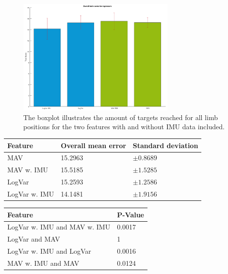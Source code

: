 \begin{figure}[H]
	\includegraphics[width=0.7\textwidth]{figures/results/sumMoreBarsWithTargetsReachedForAllRegressors}  %
	\caption{The boxplot illustrates the amount of targets reached for all limb positions for the two features with and without IMU data included.}
	\label{fig:TargetsReachedOverall}  %
\end{figure}

\begin{center}
	\begin{tabular}{l l l}
		\toprule
		\textbf{Feature} & \textbf{Overall mean error} & \textbf{Standard deviation}\\
		\midrule
		MAV & 15.2963 & $\pm 0.8689$ \\
		MAV w. IMU & 15.5185 & $\pm 1.5285$ \\
		LogVar & 15.2593 & $\pm 1.2586$ \\
		LogVar w. IMU & 14.1481 & $\pm 1.9156$ \\
		\bottomrule
	\end{tabular}
\end{center}

		
\begin{center}
	\begin{tabular}{l l}
		\toprule
		\textbf{Feature} & \textbf{P-Value}\\
		\midrule
		LogVar w. IMU and MAV w. IMU & 0.0017 \\
		LogVar and MAV & 1 \\
		LogVar w. IMU and LogVar & 0.0016 \\
		MAV w. IMU and MAV & 0.0124 \\
		\bottomrule
	\end{tabular}
\end{center}